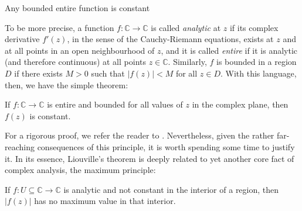 \pagebreak

\begin{mathaside}{Any bounded entire function is constant}
\label{aside.entire-functions-bounded}


To be more precise, a function $f:\mathbb{C} \to \mathbb{C}$ is called \textit{analytic} at $z$ if its complex derivative $f'(z)$, in the sense of the Cauchy-Riemann equations, exists at $z$ and at all points in an open neighbourhood of $z$, and it is called \textit{entire} if it is analytic (and therefore continuous) at all points $z\in\mathbb{C}$. Similarly, $f$ is bounded in a region $D$ if there exists $M>0$ such that $|f(z)|<M$ for all $z\in D$. With this language, then, we have the simple theorem:

\begin{namedtheorem}[Liouville's]
If $f:\mathbb{C} \to \mathbb{C}$ is entire and bounded for all values of $z$ in the complex plane, then $f(z)$ is constant.
\end{namedtheorem}


For a rigorous proof, we refer the reader to . Nevertheless, given the rather far-reaching consequences of this principle, it is worth spending some time to justify it. In its essence, Liouville's theorem is deeply related to yet another core fact of complex analysis, the maximum principle:

\begin{theorem}
If $f:U\subseteq \mathbb{C}\to\mathbb{C}$ is analytic and not constant in the interior of a region, then $|f(z)|$ has no maximum value in that interior.
\end{theorem}



\end{mathaside}
